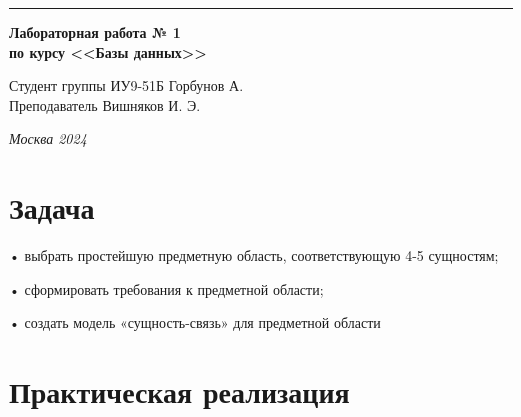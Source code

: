 \documentclass[a4paper, 14pt]{extarticle}
\begin{document}
\begin{titlepage}
\vspace*{-16pt}
\hspace{30pt}\rule{0.866\textwidth}{0.4pt}
  
\vspace{11em}

\begin{center}
\Large {\bf Лабораторная работа № 1} \\ 
\large {\bf по курсу <<Базы данных>>}\\
\end{center}\normalsize

\vspace{8em}


\begin{flushright}
  {Студент группы ИУ9-51Б Горбунов А.\hspace*{15pt} \\
  \vspace{2ex}
  Преподаватель Вишняков И. Э.\hspace*{15pt}}
\end{flushright}

\bigskip

\vfill
 

\begin{center}
\textsl{Москва 2024}
\end{center}
\end{titlepage}

\renewcommand{\ttdefault}{pcr}

\setlength{\tabcolsep}{3pt}
\newpage
\setcounter{page}{2}

\section{Задача}\label{Sect::task}
\par

• выбрать простейшую предметную область, соответствующую 4-5 сущностям;
    
• сформировать требования к предметной области;

• создать модель «сущность-связь» для предметной области 

\section{Практическая реализация}\label{Sect::task}
\par
\end{document}
